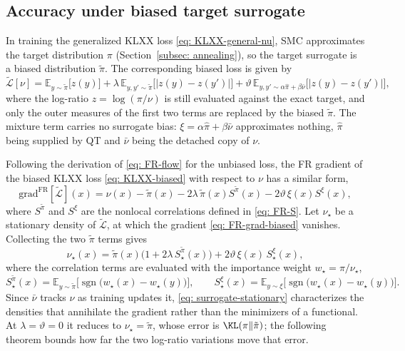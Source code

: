 \documentclass{article}
\begin{document}
\subsection{Accuracy under biased target surrogate}

In training the generalized KLXX loss \eqref{eq: KLXX-general-nu}, SMC approximates the target distribution $\pi$ (Section~\ref{subsec: annealing}), so the target surrogate is a biased distribution $\tilde\pi$. The corresponding biased loss is given by
\begin{equation}
	\tilde{\mathcal L}[\nu] = \mathbb E_{y\sim\tilde\pi}\big[z(y)\big] +  \lambda\, \mathbb E_{y,y'\sim\tilde\pi}\big[|z(y)-z(y')|\big] + \vartheta\, \mathbb E_{y,y'\sim \alpha\hat\pi+\beta\bar\nu}\big[|z(y)-z(y')|\big],
	\label{eq: KLXX-biased}
\end{equation}
where the log-ratio $z=\log(\pi/\nu)$ is still evaluated against the exact target, and only the outer measures of the first two terms are replaced  by the biased $\tilde\pi$. The mixture term carries no surrogate bias: $\xi=\alpha\hat\pi+\beta\bar\nu$ approximates nothing, $\hat\pi$ being supplied by QT and $\bar\nu$ being the detached copy of $\nu$.

Following the derivation of \eqref{eq: FR-flow} for the unbiased loss, the FR gradient of the biased KLXX loss \eqref{eq: KLXX-biased} with respect to $\nu$ has a similar form,
\begin{equation}
	\mathrm{grad}^{\mathrm{FR}}[\tilde{\mathcal L}](x) = \nu(x)-\tilde\pi(x) - 2\lambda\,\tilde\pi(x)S^{\tilde\pi}(x) - 2\vartheta\,\xi(x)S^{\xi}(x),
	\label{eq: FR-grad-biased}
\end{equation}
where $S^{\tilde\pi}$ and $S^{\xi}$ are the nonlocal correlations defined in \eqref{eq: FR-S}.
Let $\nu_\star$ be a stationary density of $\tilde {\mathcal L}$, at which the gradient \eqref{eq: FR-grad-biased} vanishes. Collecting the two $\tilde\pi$ terms gives
\begin{equation}
	\nu_\star(x) = \tilde\pi(x)\bigl(1 + 2\lambda\,S^{\tilde\pi}_\star(x)\bigr) + 2\vartheta\,\xi(x)\,S^{\xi}_\star(x),
	\label{eq: surrogate-stationary}
\end{equation}
where the correlation terms are evaluated with the importance weight $w_\star=\pi/\nu_\star$,
\begin{equation}
	S^{\tilde\pi}_\star(x) = \mathbb E_{y\sim\tilde\pi}\bigl[\operatorname{sgn}\bigl(w_\star(x)-w_\star(y)\bigr)\bigr],
	\qquad
	S^{\xi}_\star(x) = \mathbb E_{y\sim\xi}\bigl[\operatorname{sgn}\bigl(w_\star(x)-w_\star(y)\bigr)\bigr].
\end{equation}
Since $\bar\nu$ tracks $\nu$ as training updates it, \eqref{eq: surrogate-stationary} characterizes the densities that annihilate the gradient rather than the minimizers of a functional. At $\lambda=\vartheta=0$ it reduces to $\nu_\star=\tilde\pi$, whose error is $\KL(\pi\|\tilde\pi)$; the following theorem bounds how far the two log-ratio variations move that error.
\end{document}
